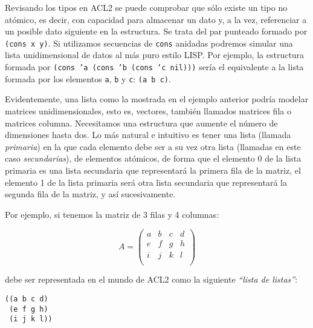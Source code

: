 \documentclass[a4paper,10pt]{article}
\begin{document}
\par \vspace{10pt}

Revisando los tipos en ACL2 se puede comprobar que sólo existe un tipo no atómico, es decir, con capacidad para almacenar un dato y, a la vez, referenciar a un 
posible dato siguiente en la estructura. Se trata del par punteado formado por \texttt{(cons x y)}. Si utilizamos secuencias de \texttt{cons} anidadas podremos simular una lista unidimensional de datos al más puro estilo LISP. Por ejemplo, la estructura formada por \texttt{(cons 'a (cons 'b (cons 'c nil)))} sería el equivalente a la lista formada por los elementos \texttt{a}, \texttt{b} y \texttt{c}: \texttt{(a b c)}.

\par \vspace{10pt}

Evidentemente, una lista como la mostrada en el ejemplo anterior podría modelar matrices unidimensionales, esto es, vectores, también llamados matrices fila o matrices columna. Necesitamos una estructura que aumente el número de dimensiones hasta dos. Lo más natural e intuitivo es tener una lista (llamada \emph{primaria}) en la que cada elemento debe ser a su vez otra lista (llamadas en este caso \emph{secundarias}), de elementos atómicos, de forma que el elemento 0 de la lista primaria es una lista secundaria que representará la primera fila de la matriz, el elemento 1 de la lista primaria será otra lista secundaria que representará la segunda fila de la matriz, y así sucesivamente.

\par \vspace{10pt}

Por ejemplo, si tenemos la matriz de 3 filas y 4 columnas:

$$
A=
\begin{pmatrix}
a & b & c & d \\
e & f & g & h \\
i & j & k & l \\ 
\end{pmatrix}
$$

\par \vspace{10pt}

debe ser representada en el mundo de ACL2 como la siguiente \emph{``lista de listas''}:

\begin{lstlisting}[language=clips]
((a b c d)
 (e f g h)
 (i j k l))
\end{lstlisting}
\end{document}
